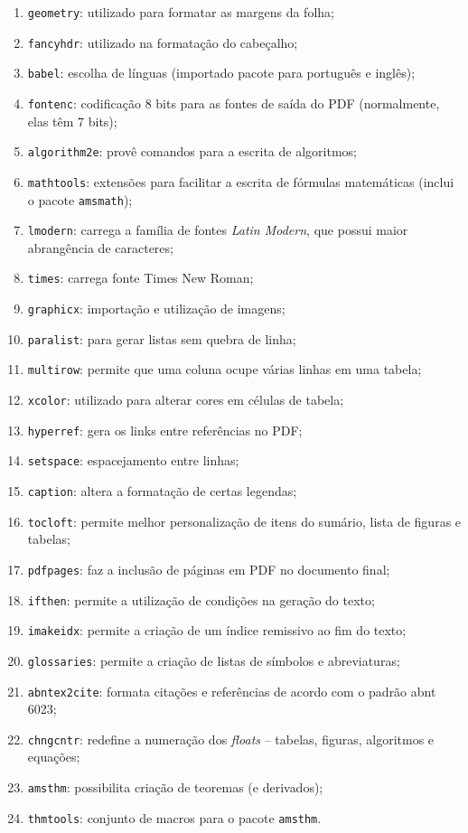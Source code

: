 \documentclass[xindy,rascunho]{fei}
\begin{document}
    \begin{enumerate}
        \item\texttt{geometry}: utilizado para formatar as margens da folha;
        \item\texttt{fancyhdr}: utilizado na formatação do cabeçalho;
        \item\texttt{babel}: escolha de línguas (importado pacote para português e inglês);
        \item\texttt{fontenc}: codificação 8 bits para as fontes de saída do PDF (normalmente, elas têm 7 bits);
        \item\texttt{algorithm2e}: provê comandos para a escrita de algoritmos;
        \item\texttt{mathtools}: extensões para facilitar a escrita de fórmulas matemáticas (inclui o pacote \texttt{amsmath});
        \item\texttt{lmodern}: carrega a família de fontes \emph{Latin Modern}, que possui maior abrangência de caracteres;
        \item\texttt{times}: carrega fonte Times New Roman;
        \item\texttt{graphicx}: importação e utilização de imagens;
        \item\texttt{paralist}: para gerar listas sem quebra de linha;
        \item\texttt{multirow}: permite que uma coluna ocupe várias linhas em uma tabela;
        \item\texttt{xcolor}: utilizado para alterar cores em células de tabela;
        \item\texttt{hyperref}: gera os links entre referências no PDF;
        \item\texttt{setspace}: espacejamento entre linhas;
        \item\texttt{caption}: altera a formatação de certas legendas;
        \item\texttt{tocloft}: permite melhor personalização de itens do sumário, lista de figuras e tabelas;
        \item\texttt{pdfpages}: faz a inclusão de páginas em PDF no documento final;
        \item\texttt{ifthen}: permite a utilização de condições na geração do texto;
        \item\texttt{imakeidx}: permite a criação de um índice remissivo ao fim do texto;
        \item{}\texttt{glossaries}: permite a criação de listas de símbolos e abreviaturas;
        \item\texttt{abntex2cite}: formata citações e referências de acordo com o padrão \gls{abnt} 6023;
        \item\texttt{chngcntr}: redefine a numeração dos \emph{floats} -- tabelas, figuras, algoritmos e equações;
        \item\texttt{amsthm}: possibilita criação de teoremas (e derivados); 
        \item\texttt{thmtools}: conjunto de macros para o pacote \texttt{amsthm}.
    \end{enumerate}
\end{document}
